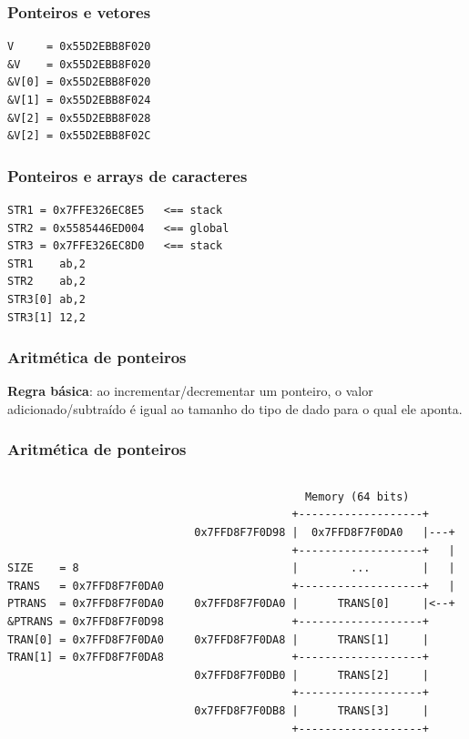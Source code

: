 \documentclass{beamer}
\begin{document}
\begin{frame}[fragile]
	\frametitle{Ponteiros e vetores}
		
	 {\normalsize 
	 	\begin{verbatim}
V     = 0x55D2EBB8F020
&V    = 0x55D2EBB8F020
&V[0] = 0x55D2EBB8F020
&V[1] = 0x55D2EBB8F024
&V[2] = 0x55D2EBB8F028
&V[2] = 0x55D2EBB8F02C
	\end{verbatim}
	}
\end{frame}

\begin{frame}[fragile]
	\frametitle{Ponteiros e arrays de caracteres}
		
	 {\scriptsize   
	 	\begin{verbatim}
STR1 = 0x7FFE326EC8E5   <== stack
STR2 = 0x5585446ED004   <== global
STR3 = 0x7FFE326EC8D0   <== stack
STR1    ab,2
STR2    ab,2
STR3[0] ab,2
STR3[1] 12,2
	\end{verbatim}
	}
\end{frame}

\begin{frame}
	\frametitle{Aritmética de ponteiros}
	\textbf{Regra básica}: ao incrementar/decrementar um ponteiro, o valor adicionado/subtraído é igual ao tamanho do tipo de dado para o qual ele aponta.
	
\end{frame}

\begin{frame}[fragile]
	\frametitle{Aritmética de ponteiros}
	\begin{columns}[T] %
	\begin{column}{.4\textwidth}
	 {\footnotesize 
	\begin{verbatim}
	
	
	
	
SIZE    = 8
TRANS   = 0x7FFD8F7F0DA0
PTRANS  = 0x7FFD8F7F0DA0
&PTRANS = 0x7FFD8F7F0D98
TRAN[0] = 0x7FFD8F7F0DA0
TRAN[1] = 0x7FFD8F7F0DA8
	\end{verbatim}
}
	\end{column}%
	\hfill%
	\begin{column}{.6\textwidth}
	 {\scriptsize 
	\begin{verbatim}
                 Memory (64 bits)
               +-------------------+
0x7FFD8F7F0D98 |  0x7FFD8F7F0DA0   |---+
               +-------------------+   |
               |        ...        |   |
               +-------------------+   |
0x7FFD8F7F0DA0 |      TRANS[0]     |<--+
               +-------------------+
0x7FFD8F7F0DA8 |      TRANS[1]     |
               +-------------------+
0x7FFD8F7F0DB0 |      TRANS[2]     |
               +-------------------+
0x7FFD8F7F0DB8 |      TRANS[3]     |
               +-------------------+
	\end{verbatim}
}
	\end{column}%
\end{columns}
\end{frame}
\end{document}
